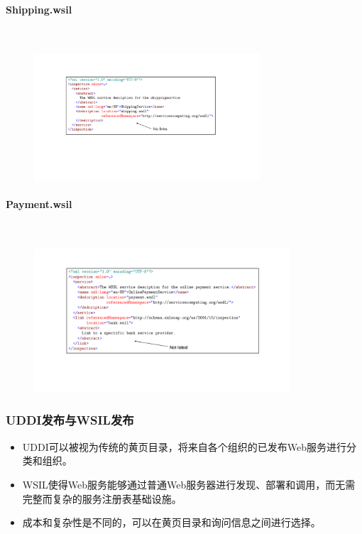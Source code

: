 \paragraph*{Shipping.wsil}~{} \par
\begin{figure}[H]
    \vspace{-0.5em}
	\centering
	\includegraphics[width=0.75\textwidth]{images/Shipping.wsil.pdf}
    \vspace{-1em}
\end{figure}

\paragraph*{Payment.wsil}~{} \par
\begin{figure}[H]
    \vspace{-0.5em}
	\centering
	\includegraphics[width=0.85\textwidth]{images/Payment.wsil.pdf}
    \vspace{-1em}
\end{figure}

\subsubsection{UDDI发布与WSIL发布}
\begin{itemize}
    \item UDDI可以被视为传统的黄页目录，将来自各个组织的已发布Web服务进行分类和组织。
    \item WSIL使得Web服务能够通过普通Web服务器进行发现、部署和调用，而无需完整而复杂的服务注册表基础设施。
    \item 成本和复杂性是不同的，可以在黄页目录和询问信息之间进行选择。
\end{itemize}


